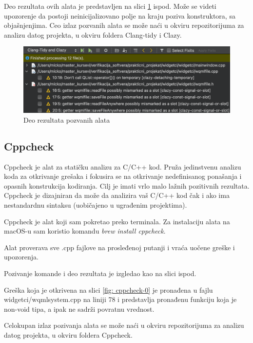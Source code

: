 \documentclass[a4paper]{article}
\begin{document}
\newpage
Deo rezultata ovih alata je predstavljen na slici \ref{fig: clang-tidy-3} ispod. Može se videti upozorenje da postoji neinicijalizovano polje na kraju poziva konstruktora, sa objašnjenjima. 
Ceo izlaz pozvanih alata se može naći u okviru repozitorijuma za analizu datog projekta, u okviru foldera Clang-tidy i Clazy.

\begin{figure}[h!]
\begin{center}
\includegraphics[scale=0.45]{clang-tidy-03.png}
\end{center}
\caption{Deo rezultata pozvanih alata}
\label{fig: clang-tidy-3}
\end{figure}

\subsection{Cppcheck}
Cppcheck je alat za statičku analizu za C/C++ kod. Pruža jedinstvenu analizu koda za otkrivanje grešaka i fokusira se na otkrivanje nedefinisanog ponašanja i opasnih konstrukcija kodiranja. Cilj je imati vrlo malo lažnih pozitivnih rezultata. Cppcheck je dizajniran da može da analizira vaš C/C++ kod čak i ako ima nestandardnu sintaksu (uobičajeno u ugrađenim projektima).

Cppcheck je alat koji sam pokretao preko terminala. Za instalaciju alata na macOS-u sam koristio komandu \textit{brew install cppcheck}.

Alat proverava sve .cpp fajlove na prosleđenoj putanji i vraća uočene greške i upozorenja.

Pozivanje komande i deo rezultata je izgledao kao na slici ispod.

Greška koja je otkrivena na slici \ref{fig: cppcheck-0} je pronađena u fajlu widgetci/wqmlsystem.cpp na liniji 78 i predstavlja pronađenu funkciju koja je non-void tipa, a ipak ne sadrži povratnu vrednost.

Celokupan izlaz pozivanja alata se može naći u okviru repozitorijuma za analizu datog projekta, u okviru foldera Cppcheck.
\end{document}
